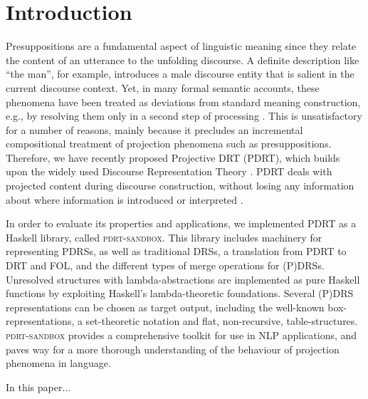 \section{Introduction}

Presuppositions are a fundamental aspect of linguistic
meaning since they relate the content of an utterance to the unfolding
discourse. A definite description like ``the man'', for example, introduces
a male discourse entity that is salient in the current discourse context.
Yet, in many formal semantic accounts, these phenomena have been treated as
deviations from standard meaning construction, e.g., by resolving them only
in a second step of processing \cite{sandt1992presupposition}. This is unsatisfactory
for a number of reasons, mainly because it precludes an incremental
compositional treatment of projection phenomena such as presuppositions.
Therefore, we have recently proposed Projective DRT (PDRT), which builds
upon the widely used Discourse Representation Theory \cite{kamp1981theory,kamp1993discourse}.
PDRT deals with projected content during discourse construction, without
losing any information about where information is introduced or interpreted
\cite{venhuizen2013iwcs}.

In order to evaluate its properties and applications, we implemented PDRT as
a Haskell library, called \textsc{pdrt-sandbox}. This library includes machinery
for representing PDRSs, as well as traditional DRSs, a translation from PDRT
to DRT and FOL, and the different types of merge operations for (P)DRSs.
Unresolved structures with lambda-abstractions \cite{muskens1996combining} are
implemented as pure Haskell functions by exploiting Haskell's
lambda-theoretic foundations. Several (P)DRS representations can be chosen
as target output, including the well-known box-representations,
a set-theoretic notation and flat, non-recursive, table-structures.
\textsc{pdrt-sandbox} provides a comprehensive toolkit for use in NLP applications,
and paves way for a more thorough understanding of the behaviour of
projection phenomena in language.  

In this paper...
